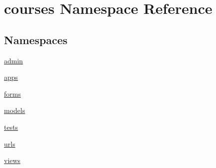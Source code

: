 \hypertarget{namespacecourses}{}\section{courses Namespace Reference}
\label{namespacecourses}
\subsection*{Namespaces}
\begin{DoxyCompactItemize}
\item 
 \hyperlink{namespacecourses_1_1admin}{admin}
\item 
 \hyperlink{namespacecourses_1_1apps}{apps}
\item 
 \hyperlink{namespacecourses_1_1forms}{forms}
\item 
 \hyperlink{namespacecourses_1_1models}{models}
\item 
 \hyperlink{namespacecourses_1_1tests}{tests}
\item 
 \hyperlink{namespacecourses_1_1urls}{urls}
\item 
 \hyperlink{namespacecourses_1_1views}{views}
\end{DoxyCompactItemize}
